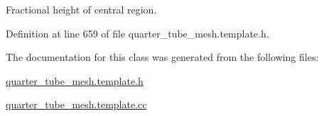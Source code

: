Fractional height of central region. 



Definition at line 659 of file quarter\+\_\+tube\+\_\+mesh.\+template.\+h.



The documentation for this class was generated from the following files\+:\begin{DoxyCompactItemize}
\item 
\hyperlink{quarter__tube__mesh_8template_8h}{quarter\+\_\+tube\+\_\+mesh.\+template.\+h}\item 
\hyperlink{quarter__tube__mesh_8template_8cc}{quarter\+\_\+tube\+\_\+mesh.\+template.\+cc}\end{DoxyCompactItemize}

